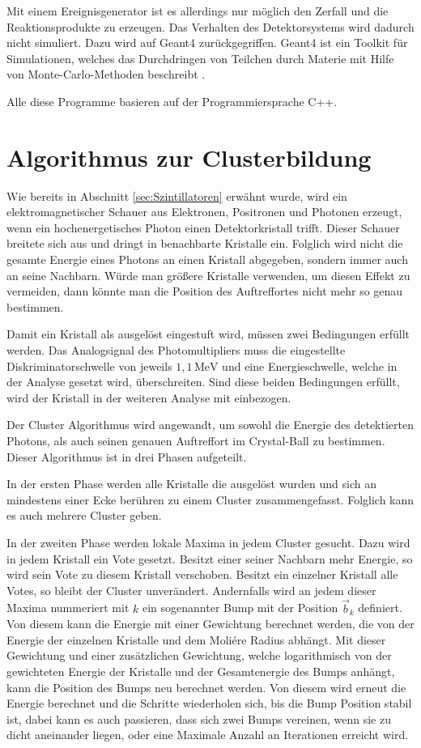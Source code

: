 \documentclass[a4paper,11pt,oneside,final,german,openbib,pdftex]{scrbook}
\begin{document}
{Mit einem Ereignisgenerator ist es allerdings nur m\"oglich den Zerfall und die Reaktionsprodukte zu erzeugen. Das Verhalten des Detektorsystems wird dadurch nicht simuliert. Dazu wird auf Geant4 zur\"uckgegriffen. Geant4 ist ein Toolkit f\"ur Simulationen, welches das Durchdringen von Teilchen durch Materie mit Hilfe von Monte-Carlo-Methoden beschreibt \cite{Ge04}.

Alle diese Programme basieren auf der Programmiersprache C++.

\section{Algorithmus zur Clusterbildung}
\label{sec:Clustering-Algorithmus}

Wie bereits in Abschnitt \ref{sec:Szintillatoren} erw\"ahnt wurde, wird ein elektromagnetischer Schauer aus Elektronen, Positronen und Photonen erzeugt, wenn ein hochenergetisches Photon einen Detektorkristall trifft. Dieser Schauer breitete sich aus und dringt in benachbarte Kristalle ein. Folglich wird nicht die gesamte Energie eines Photons an einen Kristall abgegeben, sondern immer auch an seine Nachbarn. Würde man größere Kristalle verwenden, um diesen Effekt zu vermeiden, dann könnte man die Position des Auftreffortes nicht mehr so genau bestimmen.

Damit ein Kristall als ausgel\"ost eingestuft wird, m\"ussen zwei Bedingungen erf\"ullt werden.
Das Analogsignal des Photomultipliers muss die eingestellte Diskriminatorschwelle von jeweils $1,1 \,\text{MeV}$ und eine Energieschwelle, welche in der Analyse gesetzt wird, \"uberschreiten.
Sind diese beiden Bedingungen erf\"ullt, wird der Kristall in der weiteren Analyse mit einbezogen.
 
 Der Cluster Algorithmus wird angewandt, um sowohl die Energie des detektierten Photons, als auch seinen genauen Auftreffort im Crystal-Ball zu bestimmen.
 Dieser Algorithmus ist in drei Phasen aufgeteilt.
 
 In der ersten Phase werden alle Kristalle die ausgel\"ost wurden und sich an mindestens einer Ecke ber\"uhren zu einem Cluster zusammengefasst. Folglich kann es auch mehrere Cluster geben.
 
 In der zweiten Phase werden lokale Maxima in jedem Cluster gesucht. Dazu wird in jedem Kristall ein Vote gesetzt. Besitzt einer seiner Nachbarn mehr Energie, so wird sein Vote zu diesem Kristall verschoben. Besitzt ein einzelner Kristall alle Votes, so bleibt der Cluster unver\"andert. Andernfalls wird an jedem dieser Maxima nummeriert mit $k$ ein sogenannter Bump mit der Position $\vec{b}_k$ definiert. Von diesem kann die Energie mit einer Gewichtung berechnet werden, die von der Energie der einzelnen Kristalle und dem Moli\'ere Radius abh\"angt. Mit dieser Gewichtung und einer zus\"atzlichen Gewichtung, welche logarithmisch von der gewichteten Energie der Kristalle und der Gesamtenergie des Bumps anh\"angt, kann die Position des Bumps neu berechnet werden. Von diesem wird erneut die Energie berechnet und die Schritte wiederholen sich, bis die Bump Position stabil ist, dabei kann es auch passieren, dass sich zwei Bumps vereinen, wenn sie zu dicht aneinander liegen, oder eine Maximale Anzahl an Iterationen erreicht wird.
 
}
\end{document}
